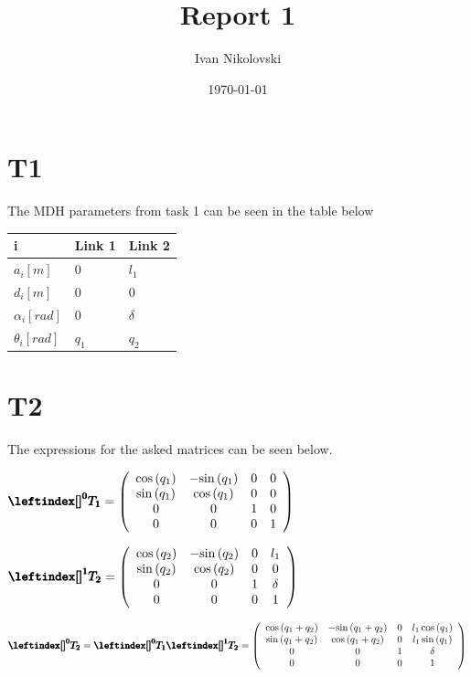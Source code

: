 \documentclass[12pt]{article}
\title{Report 1}
\author{Ivan Nikolovski}
\date{\today}
\begin{document}
\maketitle
\newpage
\section{T1}
The MDH parameters from task 1 can be seen in the table below
\vspace{1cm}
\begin{table}[htp]
\centering
\large
\begin{tabular}{ |p{2cm}||p{2cm}|p{2cm}|}
 \hline
 i & Link 1 & Link 2\\
 \hline
 $a_i[m]$   & 0   & $l_1$\\
 $d_i[m]$   & 0 & 0\\
 $\alpha_i[rad]$ & 0 & $\delta$\\
 $\theta_i[rad]$ & $q_1$ & $q_2$\\
 \hline
\end{tabular}
\end{table}

\section{T2}
The expressions for the asked matrices can be seen below.
\vspace{1cm}

$\pmb{\leftindex[]^0{T}_1}=\left(\begin{array}{cccc}
\mathrm{cos}\left(q_1 \right) & -\mathrm{sin}\left(q_1 \right) & 0 & 0\\
\mathrm{sin}\left(q_1 \right) & \mathrm{cos}\left(q_1 \right) & 0 & 0\\
0 & 0 & 1 & 0\\
0 & 0 & 0 & 1
\end{array}\right)$

$\pmb{\leftindex[]^1{T}_2}=\left(\begin{array}{cccc}
\mathrm{cos}\left(q_2 \right) & -\mathrm{sin}\left(q_2 \right) & 0 & l_1 \\
\mathrm{sin}\left(q_2 \right) & \mathrm{cos}\left(q_2 \right) & 0 & 0\\
0 & 0 & 1 & \delta \\
0 & 0 & 0 & 1
\end{array}\right)$

$\pmb{\leftindex[]^0{T}_2}=\pmb{\leftindex[]^0{T}_1\leftindex[]^1{T}_2}=\left(\begin{array}{cccc}
\mathrm{cos}\left(q_1 +q_2 \right) & -\mathrm{sin}\left(q_1 +q_2 \right) & 0 & l_1 \,\mathrm{cos}\left(q_1 \right)\\
\mathrm{sin}\left(q_1 +q_2 \right) & \mathrm{cos}\left(q_1 +q_2 \right) & 0 & l_1 \,\mathrm{sin}\left(q_1 \right)\\
0 & 0 & 1 & \delta \\
0 & 0 & 0 & 1
\end{array}\right)$
\end{document}
